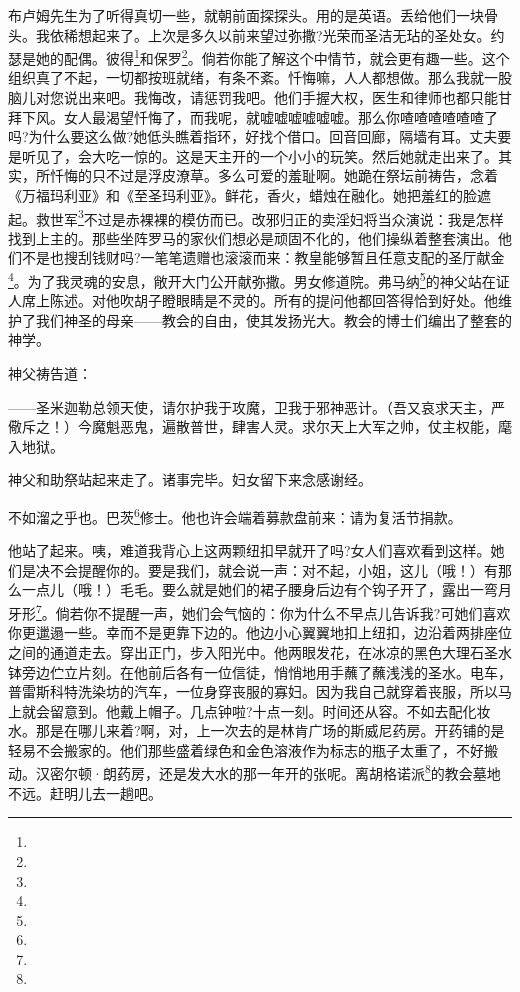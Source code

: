 \par 布卢姆先生为了听得真切一些，就朝前面探探头。用的是英语。丢给他们一块骨头。我依稀想起来了。上次是多久以前来望过弥撒?光荣而圣洁无玷的圣处女。约瑟是她的配偶。彼得\footnote{}和保罗\footnote{}。倘若你能了解这个中情节，就会更有趣一些。这个组织真了不起，一切都按班就绪，有条不紊。忏悔嘛，人人都想做。那么我就一股脑儿对您说出来吧。我悔改，请惩罚我吧。他们手握大权，医生和律师也都只能甘拜下风。女人最渴望忏悔了，而我呢，就嘘嘘嘘嘘嘘嘘。那么你喳喳喳喳喳喳了吗?为什么要这么做?她低头瞧着指环，好找个借口。回音回廊，隔墙有耳。丈夫要是听见了，会大吃一惊的。这是天主开的一个小小的玩笑。然后她就走出来了。其实，所忏悔的只不过是浮皮潦草。多么可爱的羞耻啊。她跪在祭坛前祷告，念着《万福玛利亚》和《至圣玛利亚》。鲜花，香火，蜡烛在融化。她把羞红的脸遮起。救世军\footnote{}不过是赤裸裸的模仿而已。改邪归正的卖淫妇将当众演说：我是怎样找到上主的。那些坐阵罗马的家伙们想必是顽固不化的，他们操纵着整套演出。他们不是也搜刮钱财吗?一笔笔遗赠也滚滚而来：教皇能够暂且任意支配的圣厅献金\footnote{}。为了我灵魂的安息，敞开大门公开献弥撒。男女修道院。弗马纳\footnote{}的神父站在证人席上陈述。对他吹胡子瞪眼睛是不灵的。所有的提问他都回答得恰到好处。他维护了我们神圣的母亲——教会的自由，使其发扬光大。教会的博士们编出了整套的神学。
\par 神父祷告道：
\par ——圣米迦勒总领天使，请尔护我于攻魔，卫我于邪神恶计。（吾又哀求天主，严儆斥之！）今魔魁恶鬼，遍散普世，肆害人灵。求尔天上大军之帅，仗主权能，麾入地狱。
\par 神父和助祭站起来走了。诸事完毕。妇女留下来念感谢经。
\par 不如溜之乎也。巴茨\footnote{}修士。他也许会端着募款盘前来：请为复活节捐款。
\par 他站了起来。咦，难道我背心上这两颗纽扣早就开了吗?女人们喜欢看到这样。她们是决不会提醒你的。要是我们，就会说一声：对不起，小姐，这儿（哦！）有那么一点儿（哦！）毛毛。要么就是她们的裙子腰身后边有个钩子开了，露出一弯月牙形\footnote{}。倘若你不提醒一声，她们会气恼的：你为什么不早点儿告诉我?可她们喜欢你更邋遢一些。幸而不是更靠下边的。他边小心翼翼地扣上纽扣，边沿着两排座位之间的通道走去。穿出正门，步入阳光中。他两眼发花，在冰凉的黑色大理石圣水钵旁边伫立片刻。在他前后各有一位信徒，悄悄地用手蘸了蘸浅浅的圣水。电车，普雷斯科特洗染坊的汽车，一位身穿丧服的寡妇。因为我自己就穿着丧服，所以马上就会留意到。他戴上帽子。几点钟啦?十点一刻。时间还从容。不如去配化妆水。那是在哪儿来着?啊，对，上一次去的是林肯广场的斯威尼药房。开药铺的是轻易不会搬家的。他们那些盛着绿色和金色溶液作为标志的瓶子太重了，不好搬动。汉密尔顿·朗药房，还是发大水的那一年开的张呢。离胡格诺派\footnote{}的教会墓地不远。赶明儿去一趟吧。
